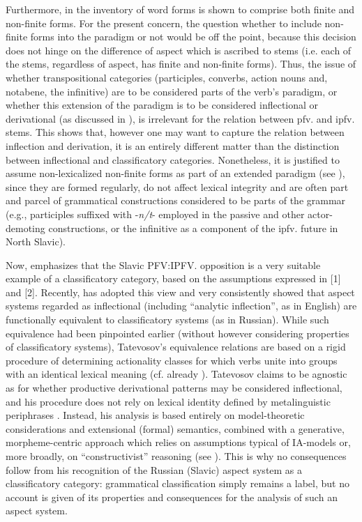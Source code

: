 \documentclass[output=paper]{langscibook}
\begin{document}
Furthermore, in  the inventory of word forms is shown to comprise both finite and non-finite forms. For the present concern, the question whether to include non-finite forms into the paradigm or not would be off the point, because this decision does not hinge on the difference of aspect which is ascribed to stems (i.e. each of the stems, regardless of aspect, has finite and non-finite forms). Thus, the issue of whether transpositional categories (participles, converbs, action nouns and, notabene, the infinitive) are to be considered parts of the verb’s paradigm, or whether this extension of the paradigm is to be considered inflectional or derivational (as discussed in \citealt{Haspelmath1996}), is irrelevant for the relation between pfv. and ipfv. stems. This shows that, however one may want to capture the relation between inflection and derivation, it is an entirely different matter than the distinction between inflectional and classificatory categories. Nonetheless, it is justified to assume non-lexicalized non-finite forms as part of an extended paradigm (see ), since they are formed regularly, do not affect lexical integrity and are often part and parcel of grammatical constructions considered to be parts of the grammar (e.g., participles suffixed with -\textit{n/t}{}- employed in the passive and other actor-demoting constructions, or the infinitive as a component of the ipfv. future in North Slavic).

Now, \citet{Plungjan2000,Plungjan2011} emphasizes that the Slavic PFV:IPFV. opposition is a very suitable example of a classificatory category, based on the assumptions expressed in [1] and [2]. Recently, \citet{Tatevosov2016} has adopted this view and very consistently showed that aspect systems regarded as inflectional (including ``analytic inflection'', as in English) are functionally equivalent to classificatory systems (as in Russian). While such equivalence had been pinpointed earlier (without however considering properties of classificatory systems), Tatevosov’s equivalence relations are based on a rigid procedure of determining actionality classes for which verbs unite into groups with an identical lexical meaning (cf. already \citealt{Tatevosov2002}). Tatevosov claims to be agnostic as for whether productive derivational patterns may be considered inflectional, and his procedure does not rely on lexical identity defined by metalinguistic periphrases \citep{Tatevosov2016}. Instead, his analysis is based entirely on model-theoretic considerations and extensional (formal) semantics, combined with a generative, morpheme-centric approach which relies on assumptions typical of IA-models \citep{Tatevosov2015} or, more broadly, on ``constructivist'' reasoning (see ). This is why no consequences follow from his recognition of the Russian (Slavic) aspect system as a classificatory category: grammatical classification simply remains a label, but no account is given of its properties and consequences for the analysis of such an aspect system.
\end{document}
